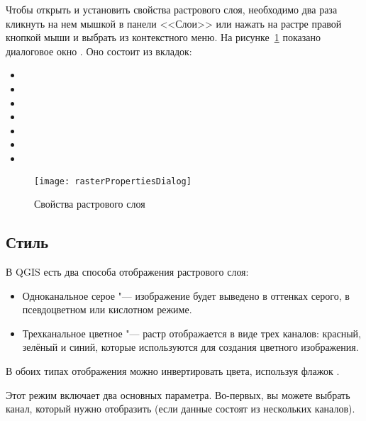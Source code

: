 Чтобы открыть и установить свойства растрового слоя, необходимо два раза
кликнуть на нем мышкой в панели <<Слои>> или нажать на растре правой
кнопкой мыши и выбрать  из контекстного
меню. На рисунке~\ref{fig:raster_properties}
показано диалоговое окно . Оно состоит из
вкладок:

\begin{itemize}[label=--]
 \item {}
 \item {}
 \item {}
 \item {}
 \item {}
 \item {}
 \item {}
\end{itemize}

\begin{figure}[h]
  \centering
   \texttt{[image: rasterPropertiesDialog]}
   \caption{Свойства растрового слоя \wincaption}\label{fig:raster_properties}
\end{figure}

\subsection{Стиль}\label{label_symbology}

В QGIS есть два способа отображения растрового слоя:

\begin{itemize}[label=--]
\item Одноканальное серое "--- изображение будет выведено в оттенках серого,
в псевдоцветном или кислотном режиме.
\item Трехканальное цветное "--- растр отображается в виде трех каналов:
красный, зелёный и синий, которые используются для создания цветного
изображения.
\end{itemize}

В обоих типах отображения можно инвертировать цвета, используя флажок
.


Этот режим включает два основных параметра. Во-первых, вы можете выбрать канал,
который нужно отобразить (если данные состоят из нескольких каналов).

